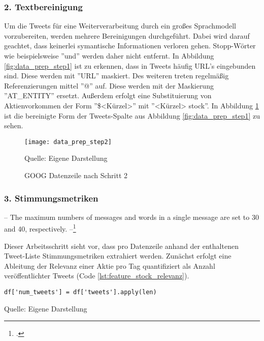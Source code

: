 \subsubsection*{2. Textbereinigung}
Um die Tweets für eine Weiterverarbeitung durch ein großes Sprachmodell vorzubereiten, werden mehrere Bereinigungen durchgeführt. Dabei wird darauf geachtet, dass keinerlei symantische Informationen verloren gehen. Stopp-Wörter wie beispielsweise ''und'' werden daher nicht entfernt.
In Abbildung \ref{fig:data_prep_step1} ist zu erkennen, dass in Tweets häufig URL's eingebunden sind. Diese werden mit ''URL'' maskiert.
Des weiteren treten regelmäßig Referenzierungen mittel ''@'' auf. Diese werden mit der Maskierung ''AT\_ENTITY'' ersetzt. 
Außerdem erfolgt eine Substituierung von Aktienvorkommen der Form ''\$<Kürzel>'' mit ''<Kürzel> stock''. In Abbildung \ref{fig:data_prep_step2} ist die bereinigte Form der Tweets-Spalte aus Abbildung \ref{fig:data_prep_step1} zu sehen.
\begin{figure}[H]
	\caption{GOOG Datenzeile nach Schritt 2}
	\texttt{[image: data\_prep\_step2]}
	\label{fig:data_prep_step2}
	\raggedright
	\normalsize{Quelle: Eigene Darstellung}
	\vspace{-1.0em}
\end{figure}


\subsubsection*{3. Stimmungsmetriken}

--
The maximum numbers of messages and words in a
single message are set to 30 and 40, respectively.
--\footcite[Kap. 5.2]{zhang2022transformer}

Dieser Arbeitsschritt sieht vor, dass pro Datenzeile anhand der enthaltenen Tweet-Liste Stimmungsmetriken extrahiert werden. Zunächst erfolgt eine Ableitung der Relevanz einer Aktie pro Tag quantifiziert als Anzahl veröffentlichter Tweets (Code \ref{lst:feature_stock_relevanz}).
\begin{lstlisting}[caption={Relevanz quantifiziert als Anzahl-Tweets}, label=lst:feature_stock_relevanz, captionpos=t]
df['num_tweets'] = df['tweets'].apply(len)
\end{lstlisting}
\vspace{-1.3em}
\normalsize{Quelle: Eigene Darstellung}

